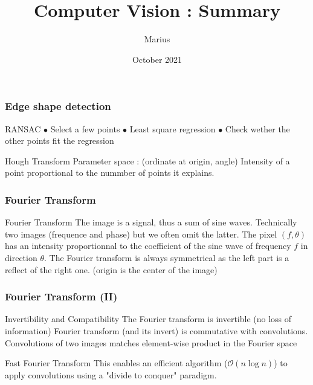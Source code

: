 \documentclass[pdf]{beamer}
\title{Computer Vision : Summary}
\author{Marius }
\date{October 2021}
\renewcommand{\O}{\mathcal{O}}
\begin{document}
\maketitle


\begin{frame}
\frametitle{Edge shape detection}

\begin{block}{RANSAC}
$\bullet$ Select a few points \newline
$\bullet$ Least square regression \newline
$\bullet$ Check wether the other points fit the regression \newline
\end{block}


\begin{block}{Hough Transform}
Parameter space : (ordinate at origin, angle)
Intensity of a point proportional to the nummber of points it explains.
\end{block}

\end{frame}
\begin{frame}
\frametitle{Fourier Transform}


\begin{block}{Fourier Transform}
The image is a signal, thus a sum of sine waves. \newline
Technically two images (frequence and phase) but we often omit the latter.\newline
The pixel $(f,\theta)$ has an intensity proportionnal to the coefficient of the sine wave of frequency $f$ in direction $\theta$.\newline
The Fourier transform is always symmetrical as the left part is a reflect of the right one. (origin is the center of the image)
\end{block}

\end{frame}
\begin{frame}
\frametitle{Fourier Transform (II)}

\begin{alertblock}{Invertibility and Compatibility}
The Fourier transform is invertible (no loss of information) \newline
Fourier transform (and its invert) is commutative with convolutions. \newline
Convolutions of two images matches element-wise product in the Fourier space\newline
\end{alertblock}

\begin{exampleblock}{Fast Fourier Transform}
This enables an efficient algorithm ($\O(n \log n)$) to apply convolutions using a "divide to conquer" paradigm.
\end{exampleblock}


\end{frame}
\end{document}
